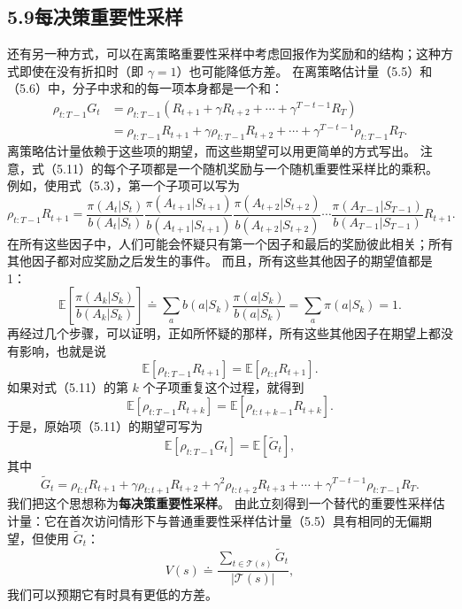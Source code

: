 \documentclass[UTF8,12pt,a4paper,fontset=fandol]{ctexart}
\begin{document}
\subsection*{5.9\quad *每决策重要性采样}

还有另一种方式，可以在离策略重要性采样中考虑回报作为奖励和的结构；这种方式即使在没有折扣时（即 $\gamma=1$）也可能降低方差。
在离策略估计量（5.5）和（5.6）中，分子中求和的每一项本身都是一个和：
\begin{equation}
\begin{aligned}
\rho_{t:T-1}G_t
&=\rho_{t:T-1}\left(R_{t+1}+\gamma R_{t+2}+\cdots+\gamma^{T-t-1}R_T\right)\\
&=\rho_{t:T-1}R_{t+1}
+\gamma\rho_{t:T-1}R_{t+2}
+\cdots+\gamma^{T-t-1}\rho_{t:T-1}R_T.
\end{aligned}
\end{equation}
离策略估计量依赖于这些项的期望，而这些期望可以用更简单的方式写出。
注意，式（5.11）的每个子项都是一个随机奖励与一个随机重要性采样比的乘积。
例如，使用式（5.3），第一个子项可以写为
\begin{equation}
\rho_{t:T-1}R_{t+1}
=\frac{\pi(A_t|S_t)}{b(A_t|S_t)}
\frac{\pi(A_{t+1}|S_{t+1})}{b(A_{t+1}|S_{t+1})}
\frac{\pi(A_{t+2}|S_{t+2})}{b(A_{t+2}|S_{t+2})}
\cdots
\frac{\pi(A_{T-1}|S_{T-1})}{b(A_{T-1}|S_{T-1})}
R_{t+1}.
\end{equation}
在所有这些因子中，人们可能会怀疑只有第一个因子和最后的奖励彼此相关；所有其他因子都对应奖励之后发生的事件。
而且，所有这些其他因子的期望值都是 1：
\begin{equation}
\mathbb{E}\!\left[\frac{\pi(A_k|S_k)}{b(A_k|S_k)}\right]
\doteq \sum_a b(a|S_k)\frac{\pi(a|S_k)}{b(a|S_k)}
=\sum_a \pi(a|S_k)=1.
\end{equation}
再经过几个步骤，可以证明，正如所怀疑的那样，所有这些其他因子在期望上都没有影响，也就是说
\begin{equation}
\mathbb{E}[\rho_{t:T-1}R_{t+1}]
=\mathbb{E}[\rho_{t:t}R_{t+1}].
\end{equation}
如果对式（5.11）的第 $k$ 个子项重复这个过程，就得到
\[
\mathbb{E}[\rho_{t:T-1}R_{t+k}]
=\mathbb{E}[\rho_{t:t+k-1}R_{t+k}].
\]
于是，原始项（5.11）的期望可写为
\[
\mathbb{E}[\rho_{t:T-1}G_t]=\mathbb{E}[\tilde G_t],
\]
其中
\[
\tilde G_t=\rho_{t:t}R_{t+1}
+\gamma\rho_{t:t+1}R_{t+2}
+\gamma^2\rho_{t:t+2}R_{t+3}
+\cdots+\gamma^{T-t-1}\rho_{t:T-1}R_T.
\]
我们把这个思想称为\textbf{每决策重要性采样}。
由此立刻得到一个替代的重要性采样估计量：它在首次访问情形下与普通重要性采样估计量（5.5）具有相同的无偏期望，但使用 $\tilde G_t$：
\begin{equation}
V(s)\doteq \frac{\sum_{t\in\mathcal{T}(s)}\tilde G_t}{|\mathcal{T}(s)|},
\end{equation}
我们可以预期它有时具有更低的方差。
\end{document}
